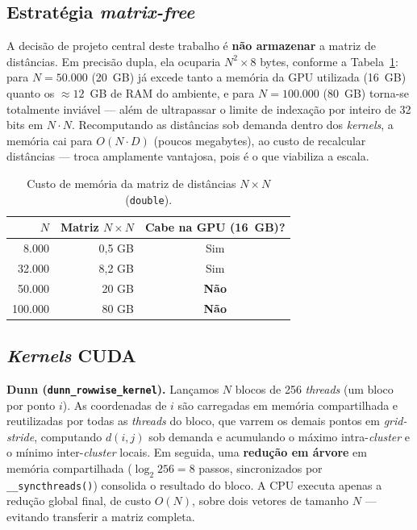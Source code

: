\documentclass[12pt]{article}
\begin{document}
\subsection{Estratégia \emph{matrix-free}}
\label{sec:matrixfree}
A decisão de projeto central deste trabalho é \textbf{não armazenar} a
matriz de distâncias. Em precisão dupla, ela ocuparia $N^2 \times 8$ bytes,
conforme a Tabela~\ref{tab:memoria}: para $N=50.000$ (20~GB) já excede tanto
a memória da GPU utilizada (16~GB) quanto os $\approx\!12$~GB de RAM do
ambiente, e para $N=100.000$ (80~GB) torna-se totalmente inviável --- além
de ultrapassar o limite de indexação por inteiro de 32 bits em $N\cdot N$.
Recomputando as distâncias sob demanda dentro dos \emph{kernels}, a memória
cai para $O(N\cdot D)$ (poucos megabytes), ao custo de recalcular distâncias
--- troca amplamente vantajosa, pois é o que viabiliza a escala.

\begin{table}[ht]
\centering
\caption{Custo de memória da matriz de distâncias $N\times N$ (\texttt{double}).}
\label{tab:memoria}
\begin{tabular}{rrc}
\toprule
$N$ & Matriz $N\times N$ & Cabe na GPU (16~GB)? \\
\midrule
8.000 & 0,5 GB & Sim \\
32.000 & 8,2 GB & Sim \\
50.000 & 20 GB & \textbf{Não} \\
100.000 & 80 GB & \textbf{Não} \\
\bottomrule
\end{tabular}
\end{table}

\subsection{\emph{Kernels} CUDA}
\textbf{Dunn (\texttt{dunn\_rowwise\_kernel}).} Lançamos $N$ blocos de 256
\emph{threads} (um bloco por ponto $i$). As coordenadas de $i$ são carregadas
em memória compartilhada e reutilizadas por todas as \emph{threads} do bloco,
que varrem os demais pontos em \emph{grid-stride}, computando $d(i,j)$ sob
demanda e acumulando o máximo intra-\emph{cluster} e o mínimo
inter-\emph{cluster} locais. Em seguida, uma \textbf{redução em árvore} em
memória compartilhada ($\log_2 256 = 8$ passos, sincronizados por
\texttt{\_\_syncthreads()}) consolida o resultado do bloco. A CPU executa
apenas a redução global final, de custo $O(N)$, sobre dois vetores de
tamanho $N$ --- evitando transferir a matriz completa.
\end{document}
